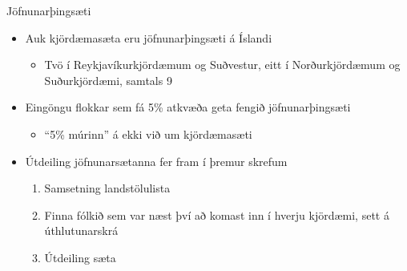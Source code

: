 \documentclass{beamer}
\begin{document}
\begin{frame}{Jöfnunarþingsæti}
    \begin{itemize}
        \item Auk kjördæmasæta eru jöfnunarþingsæti á Íslandi
        \begin{itemize}
            \item Tvö í Reykjavíkurkjördæmum og Suðvestur, eitt í Norðurkjördæmum og Suðurkjördæmi, samtals 9
        \end{itemize}
        \item Eingöngu flokkar sem fá 5\% atkvæða geta fengið jöfnunarþingsæti
        \begin{itemize}
            \item ``5\% múrinn'' á ekki við um kjördæmasæti
        \end{itemize}
        \item Útdeiling jöfnunarsætanna fer fram í þremur skrefum
        \begin{enumerate}
            \item Samsetning landstölulista
            \item Finna fólkið sem var næst því að komast inn í hverju kjördæmi, sett á úthlutunarskrá
            \item Útdeiling sæta
        \end{enumerate}
    \end{itemize}
\end{frame}
\end{document}
